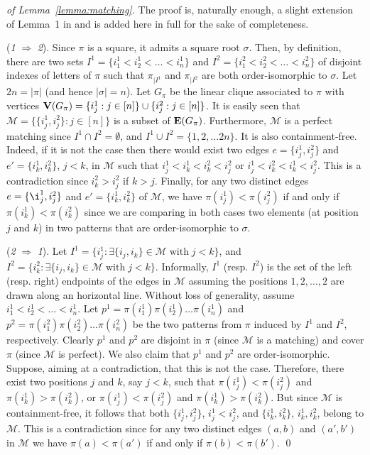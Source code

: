 \documentclass[a4paper]{llncs}
\begin{document}
\begin{proof}[of Lemma~\ref{lemma:matching}]
    The proof is, naturally enough, a slight extension of
    Lemma~1 in \cite{Rizzi:Vialette:CSR:2013} and is added here in full
    for the sake of completeness.

    (\emph{1} $\Rightarrow$ \emph{2}).
    Since $\pi$ is a square, it admits a square root $\sigma$. Then, by
    definition, there are two sets $I^1 = \{i^1_1 < i^1_2 < \dots < i^1_n\}$
    and $I^2 = \{i^2_1 < i^2_2 < \dots < i^2_n\}$ of disjoint indexes of
    letters of $\pi$ such that $\pi_{|I^1}$ and $\pi_{|I^2}$ are both
    order-isomorphic to $\sigma$. Let $2n = |\pi|$ (and hence
    $|\sigma| = n$). Let $G_\pi$ be the linear clique associated to $\pi$
    with vertices
    $\mathbf{V}(G_\pi) = \{i^1_j : j \in [n]\} \cup \{i^2_j : j \in [n]\}$. It
    is easily seen that $\mathcal{M} = \{\{i^1_j, i^2_j\} : j \in [n]\}$
    is a subset of $\mathbf{E}(G_\pi)$. Furthermore, $\mathcal{M}$ is a perfect
    matching since $I^1 \cap I^2 = \emptyset$, and
    $I^1 \cup I^2 = \{1, 2,  \dots 2n\}$. It is also containment-free.
    Indeed, if it is not the case then there would exist two edges
    $e = \{i^1_j, i^2_j\}$ and $e' = \{i^1_k, i^2_k\}$, $j < k$, in
    $\mathcal{M}$ such that $i^1_j < i^1_k < i^2_k < i^2_j$ or
    $i^1_j < i^2_k < i^1_k < i^2_j$. This is a contradiction since
    $i^2_k > i^2_j$ if $k > j$. Finally, for any two distinct edges
    $e = \{\i^1_j, i^2_j\}$ and $e' = \{i^1_k, i^2_k\}$ of $\mathcal{M}$,
    we have $\pi(i^1_j) < \pi(i^2_j)$ if and only if
    $\pi(i^1_k) < \pi(i^2_k)$ since we are comparing in both cases two
    elements (at position $j$ and $k$) in two patterns that are
    order-isomorphic to $\sigma$.

    (\emph{2} $\Rightarrow$ \emph{1}).
    Let $I^1 = \{i^1_j : \exists \{i_j, i_k\} \in \mathcal{M}
    \;\text{with}\; j < k\}$, and
    $I^2 = \{i^2_k : \exists \{i_j, i_k\} \in \mathcal{M}
    \;\text{with}\; j < k\}$.
    Informally, $I^1$ (resp. $I^2$) is the set of the left (resp. right)
    endpoints of the edges in $\mathcal{M}$ assuming the positions
    $1, 2, \dots, 2$ are drawn along an horizontal line.
    Without loss of generality, assume $i^1_1 < i^1_2 < \dots < i^1_n$.
    Let $p^1 = \pi(i^1_1) \pi(i^1_2) \dots \pi(i^1_n)$ and
    $p^2 = \pi(i^2_1) \pi(i^2_2) \dots \pi(i^2_n)$ be the two patterns
    from $\pi$ induced by $I^1$ and $I^2$, respectively. Clearly $p^1$
    and $p^2$ are disjoint in $\pi$ (since $\mathcal{M}$ is a matching)
    and cover $\pi$ (since $\mathcal{M}$ is perfect). We also claim that
    $p^1$ and $p^2$ are order-isomorphic. Suppose, aiming at a
    contradiction, that this is not the case. Therefore, there exist two
    positions $j$ and $k$, say $j < k$, such that
    $\pi(i^1_j) < \pi(i^2_j)$ and $\pi(i^1_k) > \pi(i^2_k)$, or
    $\pi(i^1_j) < \pi(i^2_j)$ and $\pi(i^1_k) > \pi(i^2_k)$.
    But since $\mathcal{M}$ is containment-free, it follows that both
    $\{i^1_j, i^2_j\}$, $i^1_j < i^2_j$, and $\{i^1_k, i^2_k\}$,
    $i^1_k, i^2_k$, belong to $\mathcal{M}$. This is a contradiction
    since for any two distinct edges $(a, b)$ and $(a', b')$ in
    $\mathcal{M}$ we have $\pi(a) < \pi(a')$ if and only if
    $\pi(b) < \pi(b')$.
    \qed
\end{proof}
\end{document}
